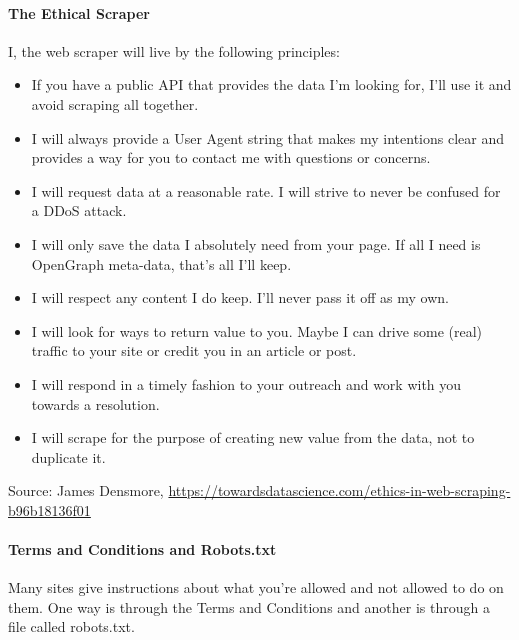 \documentclass[
  openany]{book}
\providecommand{\tightlist}{%
  \setlength{\itemsep}{0pt}\setlength{\parskip}{0pt}}
\begin{document}
\hypertarget{the-ethical-scraper}{%
\paragraph{The Ethical Scraper}\label{the-ethical-scraper}}

I, the web scraper will live by the following principles:

\begin{itemize}
\tightlist
\item
  If you have a public API that provides the data I'm looking for, I'll use it and avoid scraping all together.\\
\item
  I will always provide a User Agent string that makes my intentions clear and provides a way for you to contact me with questions or concerns.\\
\item
  I will request data at a reasonable rate. I will strive to never be confused for a DDoS attack.\\
\item
  I will only save the data I absolutely need from your page. If all I need is OpenGraph meta-data, that's all I'll keep.\\
\item
  I will respect any content I do keep. I'll never pass it off as my own.\\
\item
  I will look for ways to return value to you. Maybe I can drive some (real) traffic to your site or credit you in an article or post.\\
\item
  I will respond in a timely fashion to your outreach and work with you towards a resolution.\\
\item
  I will scrape for the purpose of creating new value from the data, not to duplicate it.
\end{itemize}

Source: James Densmore, \url{https://towardsdatascience.com/ethics-in-web-scraping-b96b18136f01}

\hypertarget{terms-and-conditions-and-robots.txt}{%
\paragraph{Terms and Conditions and Robots.txt}\label{terms-and-conditions-and-robots.txt}}

Many sites give instructions about what you're allowed and not allowed to do on them.
One way is through the Terms and Conditions and another is through a file called robots.txt.
\end{document}
